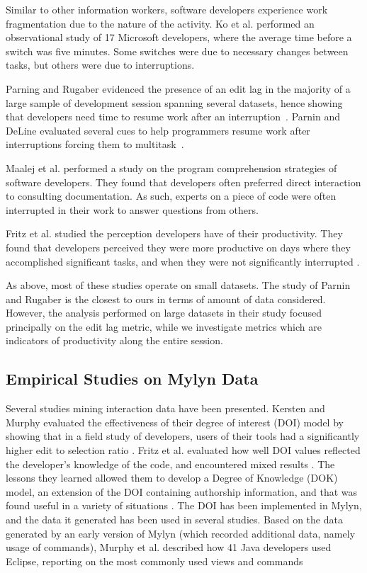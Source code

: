 \documentclass[times]{smrauth}
\begin{document}
Similar to other information workers, software developers experience work fragmentation due to the nature of the activity. Ko et al. \cite{KDV07} performed an observational study of 17 Microsoft developers, where the average time before a switch was five minutes. Some switches were due to necessary changes between tasks, but others were due to interruptions. 

Parning and Rugaber evidenced the presence of an edit lag in the majority of a large sample of development session spanning several datasets, hence showing that developers need time to resume work after an interruption~\cite{PR11}. Parnin and DeLine evaluated several cues  to help programmers resume work after interruptions forcing them to multitask~\cite{PD10}.

Maalej et al. \cite{MTRK14} performed a study on the program comprehension strategies of software developers. They found that developers often preferred direct interaction to consulting documentation. As such, experts on a piece of code were often interrupted in their work to answer questions from others.

Fritz et al. studied the perception developers have of their productivity. They found that developers perceived they were more productive on days where they accomplished significant tasks, and when they were not significantly interrupted \cite{MFMZ14}.

As above, most of these studies operate on small datasets. The study of Parnin and Rugaber is the closest to ours in terms of amount of data considered. However, the analysis performed on large datasets in their study focused principally on the edit lag metric, while we investigate metrics which are indicators of productivity along the entire session.


\subsection{Empirical Studies on Mylyn Data}

Several studies mining interaction data have been presented. Kersten and Murphy evaluated the effectiveness of their degree of interest (DOI) model by showing that in a field study of developers, users of their tools had a significantly higher edit to selection ratio \cite{KM06}. Fritz et al. evaluated how well DOI values reflected the developer's knowledge of the code, and encountered mixed results \cite{FMH07}. The lessons they learned allowed them to develop a Degree of Knowledge (DOK) model, an extension of the DOI containing authorship information, and that was found useful in a variety of situations \cite{FOMM10}. The DOI has been implemented in Mylyn, and the data it generated has been used in several studies. Based on the data generated by an early version of Mylyn (which recorded additional data, namely usage of commands), Murphy et al. described how 41 Java developers used Eclipse, reporting on the most commonly used views and commands \cite{MKF06}
\end{document}
